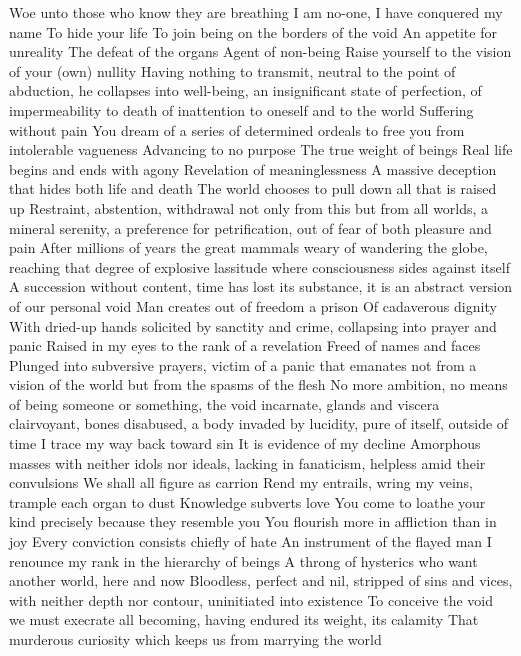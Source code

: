 \documentclass{article}
\begin{document}
Woe unto those who know they are breathing
I am no-one, I have conquered my name
To hide your life
To join being on the borders of the void
An appetite for unreality
The defeat of the organs
Agent of non-being
Raise yourself to the vision of your (own) nullity
Having nothing to transmit, neutral to the point of abduction, he collapses into well-being, an insignificant state of perfection, of impermeability to death of inattention to oneself and to the world
Suffering without pain
You dream of a series of determined ordeals to free you from intolerable vagueness
Advancing to no purpose
The true weight of beings
Real life begins and ends with agony
Revelation of meaninglessness
A massive deception that hides both life and death
The world chooses to pull down all that is raised up
Restraint, abstention, withdrawal not only from this but from all worlds, a mineral serenity, a preference for petrification, out of fear of both pleasure and pain
After millions of years the great mammals weary of wandering the globe, reaching that degree of explosive lassitude where consciousness sides against itself
A succession without content, time has lost its substance, it is an abstract version of our personal void
Man creates out of freedom a prison
Of cadaverous dignity
With dried-up hands solicited by sanctity and crime, collapsing into prayer and panic
Raised in my eyes to the rank of a revelation
Freed of names and faces
Plunged into subversive prayers, victim of a panic that emanates not from a vision of the world but from the spasms of the flesh
No more ambition, no means of being someone or something, the void incarnate, glands and viscera clairvoyant, bones disabused, a body invaded by lucidity, pure of itself, outside of time
I trace my way back toward sin
It is evidence of my decline
Amorphous masses with neither idols nor ideals, lacking in fanaticism, helpless amid their convulsions
We shall all figure as carrion
Rend my entrails, wring my veins, trample each organ to dust
Knowledge subverts love
You come to loathe your kind precisely because they resemble you
You flourish more in affliction than in joy
Every conviction consists chiefly of hate
An instrument of the flayed man
I renounce my rank in the hierarchy of beings
A throng of hysterics who want another world, here and now
Bloodless, perfect and nil, stripped of sins and vices, with neither depth nor contour, uninitiated into existence
To conceive the void we must execrate all becoming, having endured its weight, its calamity
That murderous curiosity which keeps us from marrying the world
\fi
\end{document}
